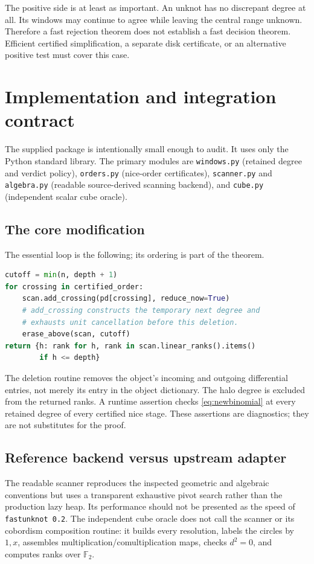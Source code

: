 \documentclass[11pt]{article}
\theoremstyle{definition}\newtheorem{definition}[theorem]{Definition}
\theoremstyle{remark}\newtheorem{remark}[theorem]{Remark}
\newcommand{\F}{\mathbb F_2}
\begin{document}
The positive side is at least as important. An unknot has no discrepant degree at all. Its windows may continue to agree while leaving the central range unknown. Therefore a fast rejection theorem does not establish a fast decision theorem. Efficient certified simplification, a separate disk certificate, or an alternative positive test must cover this case.

\section{Implementation and integration contract}
\label{sec:implementation}
The supplied package is intentionally small enough to audit. It uses only the Python standard library. The primary modules are \texttt{windows.py} (retained degree and verdict policy), \texttt{orders.py} (nice-order certificates), \texttt{scanner.py} and \texttt{algebra.py} (readable source-derived scanning backend), and \texttt{cube.py} (independent scalar cube oracle).

\subsection{The core modification}
The essential loop is the following; its ordering is part of the theorem.
\begin{lstlisting}[language=Python]
cutoff = min(n, depth + 1)
for crossing in certified_order:
    scan.add_crossing(pd[crossing], reduce_now=True)
    # add_crossing constructs the temporary next degree and
    # exhausts unit cancellation before this deletion.
    erase_above(scan, cutoff)
return {h: rank for h, rank in scan.linear_ranks().items()
        if h <= depth}
\end{lstlisting}
The deletion routine removes the object's incoming and outgoing differential entries, not merely its entry in the object dictionary. The halo degree is excluded from the returned ranks. A runtime assertion checks \eqref{eq:newbinomial} at every retained degree of every certified nice stage. These assertions are diagnostics; they are not substitutes for the proof.

\subsection{Reference backend versus upstream adapter}
The readable scanner reproduces the inspected geometric and algebraic conventions but uses a transparent exhaustive pivot search rather than the production lazy heap. Its performance should not be presented as the speed of \texttt{fastunknot 0.2}. The independent cube oracle does not call the scanner or its cobordism composition routine: it builds every resolution, labels the circles by $1,x$, assembles multiplication/comultiplication maps, checks $d^2=0$, and computes ranks over $\F$.
\end{document}
